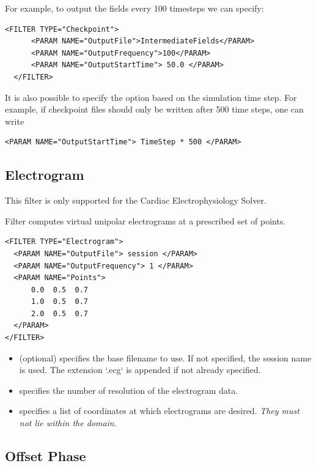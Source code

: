 For example, to output the fields every 100 timesteps we can specify:

\begin{lstlisting}[style=XMLStyle,gobble=2]
  <FILTER TYPE="Checkpoint">
      <PARAM NAME="OutputFile">IntermediateFields</PARAM>
      <PARAM NAME="OutputFrequency">100</PARAM>
      <PARAM NAME="OutputStartTime"> 50.0 </PARAM>
  </FILTER>
\end{lstlisting}

It is also possible to specify the  option based on
the simulation time step. For example, if checkpoint files should only be
written after 500 time steps, one can write
\begin{lstlisting}[style=XMLStyle,gobble=2]
      <PARAM NAME="OutputStartTime"> TimeStep * 500 </PARAM>
\end{lstlisting}

\subsection{Electrogram}\label{filters:Electrogram}

\begin{notebox}
  This filter is only supported for the Cardiac Electrophysiology Solver.
\end{notebox}

Filter  computes virtual unipolar electrograms at a
     prescribed set of points.
\begin{lstlisting}[style=XmlStyle]
<FILTER TYPE="Electrogram">
  <PARAM NAME="OutputFile"> session </PARAM>
  <PARAM NAME="OutputFrequency"> 1 </PARAM>
  <PARAM NAME="Points">
      0.0  0.5  0.7
      1.0  0.5  0.7
      2.0  0.5  0.7
  </PARAM>
</FILTER>
\end{lstlisting}
    \begin{itemize}
    \item {} (optional) specifies the base filename to use. If
    not specified, the session name is used. The extension `.ecg` is appended if not already specified.
    \item {} specifies the number of resolution of the
    electrogram data.
    \item {} specifies a list of coordinates at which electrograms
    are desired. \emph{They must not lie within the domain.}
    \end{itemize}

\subsection{Offset Phase}\label{filters:OffsetPhase}

